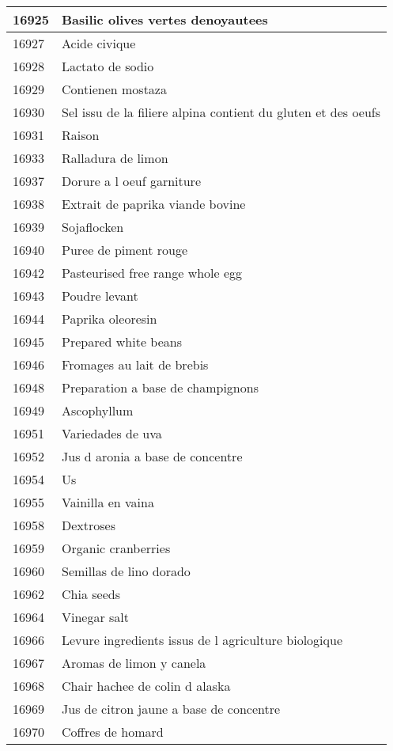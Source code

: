 \begin{longtable}{|l|l|}
16925 & Basilic olives vertes denoyautees \\ \hline 
16927 & Acide civique \\ \hline 
16928 & Lactato de sodio \\ \hline 
16929 & Contienen mostaza \\ \hline 
16930 & Sel  issu de la filiere alpina contient du gluten et des oeufs \\ \hline 
16931 & Raison \\ \hline 
16933 & Ralladura de limon \\ \hline 
16937 & Dorure a l oeuf garniture \\ \hline 
16938 & Extrait de paprika viande bovine \\ \hline 
16939 & Sojaflocken \\ \hline 
16940 & Puree de piment rouge \\ \hline 
16942 & Pasteurised free range whole egg \\ \hline 
16943 & Poudre levant \\ \hline 
16944 & Paprika oleoresin \\ \hline 
16945 & Prepared white beans \\ \hline 
16946 & Fromages au lait de brebis \\ \hline 
16948 & Preparation a base de champignons \\ \hline 
16949 & Ascophyllum \\ \hline 
16951 & Variedades de uva \\ \hline 
16952 & Jus d aronia a base de concentre \\ \hline 
16954 & Us \\ \hline 
16955 & Vainilla en vaina \\ \hline 
16958 & Dextroses \\ \hline 
16959 & Organic cranberries \\ \hline 
16960 & Semillas de lino dorado \\ \hline 
16962 & Chia seeds \\ \hline 
16964 & Vinegar salt \\ \hline 
16966 & Levure  ingredients issus de l agriculture biologique \\ \hline 
16967 & Aromas de limon y canela \\ \hline 
16968 & Chair hachee de colin d alaska \\ \hline 
16969 & Jus de citron jaune a base de concentre \\ \hline 
16970 & Coffres de homard \\ \hline 

\end{longtable}
